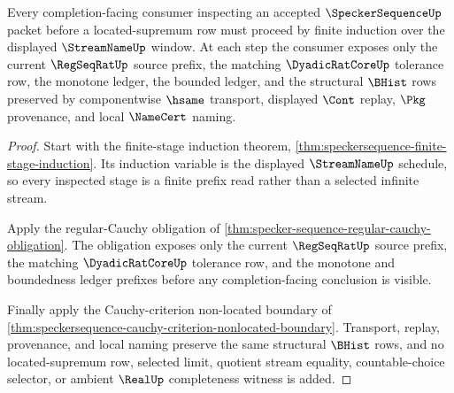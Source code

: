 \begin{theorem}
\label{thm:specker-sequence-regular-window-induction}
Every completion-facing consumer inspecting an accepted $\SpeckerSequenceUp$
packet before a located-supremum row must proceed by finite induction over the
displayed $\StreamNameUp$ window. At each step the consumer exposes only the
current $\RegSeqRatUp$ source prefix, the matching $\DyadicRatCoreUp$ tolerance
row, the monotone ledger, the bounded ledger, and the structural $\BHist$ rows
preserved by componentwise $\hsame$ transport, displayed $\Cont$ replay, $\Pkg$
provenance, and local $\NameCert$ naming.
\end{theorem}
\begin{proof}
Start with the finite-stage induction theorem,
\autoref{thm:speckersequence-finite-stage-induction}. Its induction variable is
the displayed $\StreamNameUp$ schedule, so every inspected stage is a finite
prefix read rather than a selected infinite stream.

Apply the regular-Cauchy obligation of
\autoref{thm:specker-sequence-regular-cauchy-obligation}. The obligation exposes
only the current $\RegSeqRatUp$ source prefix, the matching
$\DyadicRatCoreUp$ tolerance row, and the monotone and boundedness ledger
prefixes before any completion-facing conclusion is visible.

Finally apply the Cauchy-criterion non-located boundary of
\autoref{thm:speckersequence-cauchy-criterion-nonlocated-boundary}. Transport,
replay, provenance, and local naming preserve the same structural $\BHist$ rows,
and no located-supremum row, selected limit, quotient stream equality,
countable-choice selector, or ambient $\RealUp$ completeness witness is added.
\end{proof}

